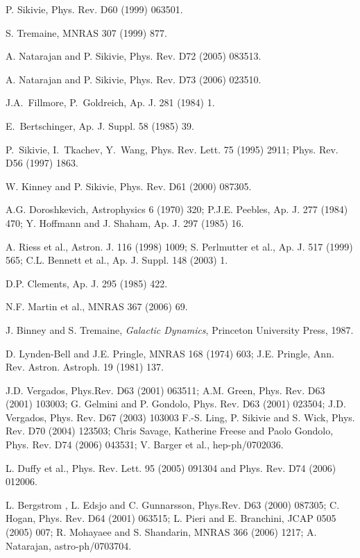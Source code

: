 \documentclass[aps,prd,preprint,tightenlines,floatfix,showpacs,groupedaddress]{revtex4}
\begin{document}
{\begin{references}
P. Sikivie, Phys. Rev. D60 (1999) 063501.

S. Tremaine, MNRAS 307 (1999) 877.

A. Natarajan and P. Sikivie, Phys. Rev. D72 (2005) 083513.

A. Natarajan and P. Sikivie, Phys. Rev. D73 (2006) 023510.

J.A.\ Fillmore, P.\ Goldreich, Ap. J. 281 (1984) 1.

E.\ Bertschinger, Ap. J. Suppl. 58 (1985) 39.

P.\ Sikivie, I.\ Tkachev, Y.\ Wang, Phys. Rev. Lett. 75
(1995) 2911; Phys. Rev. D56 (1997) 1863.

W. Kinney and P. Sikivie, Phys. Rev. D61 (2000) 087305.

A.G. Doroshkevich, Astrophysics 6 (1970) 320;
P.J.E. Peebles, Ap. J. 277 (1984) 470;
Y. Hoffmann and J. Shaham, Ap. J. 297 (1985) 16.

A. Riess et al., Astron. J. 116 (1998) 1009;
S. Perlmutter et al., Ap. J. 517 (1999) 565;
C.L. Bennett et al., Ap. J. Suppl. 148 (2003) 1.

D.P. Clements, Ap. J. 295 (1985) 422.

N.F. Martin et al., MNRAS 367 (2006) 69.

J. Binney and S. Tremaine, {\it Galactic Dynamics}, 
Princeton University Press, 1987.

D. Lynden-Bell and J.E. Pringle, MNRAS 168 (1974) 603;
J.E. Pringle, Ann. Rev. Astron. Astroph. 19 (1981) 137.

J.D. Vergados, Phys.Rev. D63 (2001) 063511;
A.M. Green, Phys. Rev. D63 (2001) 103003; 
G. Gelmini and P. Gondolo, Phys. Rev. D63 (2001) 023504;
J.D. Vergados, Phys. Rev. D67 (2003) 103003
F.-S. Ling, P. Sikivie and S. Wick, Phys. Rev. D70 (2004) 123503;
Chris Savage, Katherine Freese and Paolo Gondolo, Phys. Rev. D74
(2006) 043531; V. Barger et al., hep-ph/0702036.

L. Duffy et al., Phys. Rev. Lett. 95 (2005) 091304 and
Phys. Rev. D74 (2006) 012006.

L. Bergstrom , L. Edsjo and C. Gunnarsson, Phys.Rev. D63 (2000)
087305; C. Hogan, Phys. Rev. D64 (2001) 063515;
L. Pieri and E. Branchini, JCAP 0505 (2005) 007;
R. Mohayaee and S. Shandarin, MNRAS 366 (2006) 1217;
A. Natarajan, astro-ph/0703704.


\end{references}}
\end{document}
